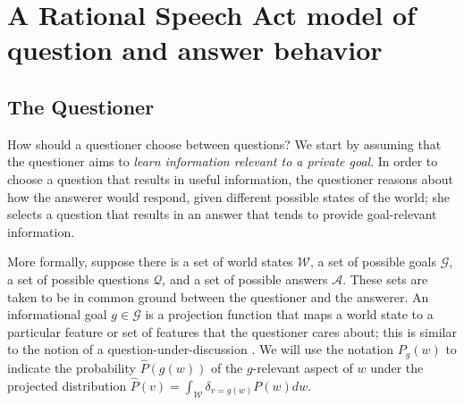 \documentclass[12pt, floatsintext, man]{apa6}
\begin{document}
\section{A Rational Speech Act model of question and answer behavior}
\label{sec:model}

\subsection{The Questioner}

How should a questioner choose between questions?
%
We start by assuming that the questioner aims to \emph{learn information relevant to a private goal}.
%
In order to choose a question that results in useful information, the questioner reasons about how the answerer would respond, given different possible states of the world; she selects a question that results in an answer that tends to provide goal-relevant information.
%


More formally, suppose there is a set of world states $\mathcal{W}$, a set of possible goals $\mathcal{G}$, a set of possible questions $\mathcal{Q}$, and a set of possible answers $\mathcal{A}$.
These sets are taken to be in common ground between the questioner and the answerer.
An informational goal $g \in \mathcal{G}$ is a projection function that maps a world state to a particular feature or set of features that the questioner cares about; this is similar to the notion of a question-under-discussion \cite{Roberts96_InformationStructureDiscourse}.
We will use the notation $P_{g}(w)$ to indicate the probability $\hat{P}(g(w))$ of the $g$-relevant aspect of $w$ under the projected distribution 
$\hat{P}(v) = \int_{\mathcal{W}} \delta_{v=g(w)}P(w)dw$.

\newcommand{\KL}[2]{\ensuremath{D_{KL}({#1}\, \| \, {#2})}}
\newcommand{\E}[2]{\ensuremath{\mathbb{E}_{#1}\left [#2 \right]}}
\end{document}
